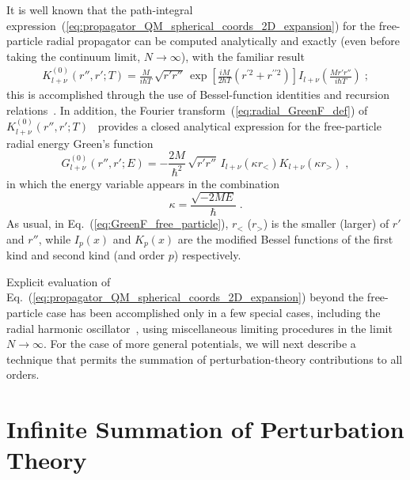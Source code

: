 \documentclass[a4paper,preprint,draft,showpacs,amsmath,amsfonts,amssymb,aps,prd]{revtex4}%
\begin{document}
It is well known that the path-integral 
expression~(\ref{eq:propagator_QM_spherical_coords_2D_expansion})
for the free-particle radial propagator
can be computed analytically and exactly
(even before taking the continuum limit, $N \rightarrow \infty$),
with the familiar result~\cite{pea:69}
\begin{eqnarray}
K^{(0)}_{l+\nu} (r'',r';T) 
=
\frac{M}{i \hbar T} 
\,
\sqrt{ r' r''} 
\,
\exp \left[ \frac{i M}{2 \hbar T} \left(r^{\prime 2} + r^{\prime \prime 2} 
\right) \right]
I_{l+\nu} \left( \frac{Mr'r''}{i \hbar T} \right)
\;   ;
\label{eq:propagator_free_particle}
\end{eqnarray}
this is accomplished through the use of 
Bessel-function identities and recursion relations~\cite{weber}. 
In addition, the Fourier transform~(\ref{eq:radial_GreenF_def}) of 
$
K^{(0)}_{l+\nu} (r'',r';T) 
$~\cite{gra:00}
provides a closed analytical expression
for the free-particle radial energy Green's function
\begin{equation}
G^{(0)}_{l+\nu} (r'',r';E)    
 = 
 -
\frac{2M}{\hbar^{2}} 
\,
\sqrt{ r'r''} 
\,
I_{l+\nu}( \kappa r_{<} ) K_{l+ \nu} (\kappa r_{>} )
\; ,
\label{eq:GreenF_free_particle}
\end{equation}
in which the energy variable appears in the 
combination
\begin{equation}
\kappa=
  \frac{ \sqrt{-2ME} }{\hbar}
\;  .
\label{eq:imaginary_wave_number}
\end{equation}
As usual, in Eq.~(\ref{eq:GreenF_free_particle}),
$r_{<}$ ($r_{>}$) is the smaller 
(larger) of $r'$ and $r''$, while 
$I_{p}(x)$ 
and
$K_{p}(x)$ 
are the modified Bessel functions of the first kind and second kind
(and order $p$) respectively.

Explicit evaluation of 
Eq.~(\ref{eq:propagator_QM_spherical_coords_2D_expansion}) 
beyond the free-particle case has been accomplished only in a few 
special cases, including the radial harmonic oscillator~\cite{gro:98},
using miscellaneous limiting procedures in the limit
$N \rightarrow \infty$.
For the case of more general potentials, 
we will next describe a 
 technique that permits the summation of perturbation-theory
contributions to all orders.



\section{Infinite Summation of Perturbation Theory}
\label{sec:infinite_summation}
\end{document}
